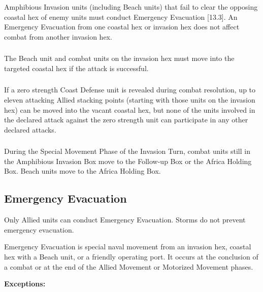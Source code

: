 \subsubsection{} Amphibious Invasion units (including Beach units) that fail to clear the opposing coastal hex of enemy units must conduct Emergency Evacuation [13.3]. An Emergency Evacuation from one coastal hex or invasion hex does not affect combat from another invasion hex.

\subsubsection{} The Beach unit and combat units on the invasion hex must move into the targeted coastal hex if the attack is successful.

\subsubsection{} If a zero strength Coast Defense unit is revealed during combat resolution, up to eleven attacking Allied stacking points (starting with those units on the invasion hex) can be moved into the vacant coastal hex, but none of the units involved in the declared attack against the zero strength unit can participate in any other declared attacks.

\subsubsection{} During the Special Movement Phase of the Invasion Turn, combat units still in the Amphibious Invasion Box move to the Follow-up Box or the Africa Holding Box. Beach units move to the Africa Holding Box.

\subsection{Emergency Evacuation}

Only Allied units can conduct Emergency Evacuation. Storms do not prevent emergency evacuation.

Emergency Evacuation is special naval movement from an invasion hex, coastal hex with a Beach unit, or a friendly operating port. It occurs at the conclusion of a combat or at the end of the Allied Movement or Motorized Movement phases.

\textbf{Exceptions:}

